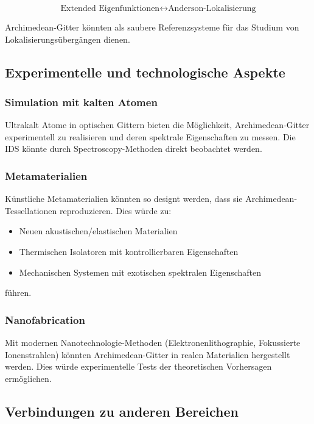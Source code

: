 \documentclass[a4paper,12pt]{article}
\theoremstyle{definition}
\begin{document}
\[
\text{Extended Eigenfunktionen} \leftrightarrow \text{Anderson-Lokalisierung}
\]

Archimedean-Gitter könnten als saubere Referenzsysteme für das Studium von Lokalisierungsübergängen dienen.

\subsection{Experimentelle und technologische Aspekte}

\subsubsection{Simulation mit kalten Atomen}

Ultrakalt Atome in optischen Gittern bieten die Möglichkeit, Archimedean-Gitter experimentell zu realisieren und deren spektrale Eigenschaften zu messen. Die IDS könnte durch Spectroscopy-Methoden direkt beobachtet werden.

\subsubsection{Metamaterialien}

Künstliche Metamaterialien könnten so designt werden, dass sie Archimedean-Tessellationen reproduzieren. Dies würde zu:
\begin{itemize}
	\item Neuen akustischen/elastischen Materialien
	\item Thermischen Isolatoren mit kontrollierbaren Eigenschaften
	\item Mechanischen Systemen mit exotischen spektralen Eigenschaften
\end{itemize}

führen.

\subsubsection{Nanofabrication}

Mit modernen Nanotechnologie-Methoden (Elektronenlithographie, Fokussierte Ionenstrahlen) könnten Archimedean-Gitter in realen Materialien hergestellt werden. Dies würde experimentelle Tests der theoretischen Vorhersagen ermöglichen.

\subsection{Verbindungen zu anderen Bereichen}
\end{document}

